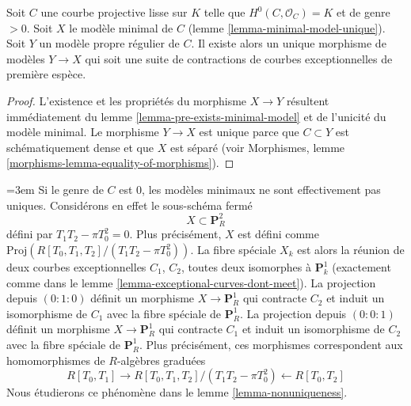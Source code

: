 \begin{lemma}
\label{lemma-minimal-model-mapping-property}
Soit $C$ une courbe projective lisse sur $K$ telle que $H^0(C, \mathcal{O}_C) = K$
et de genre $> 0$. Soit $X$ le modèle minimal de $C$
(lemme \ref{lemma-minimal-model-unique}).
Soit $Y$ un modèle propre régulier de $C$. Il existe alors un unique
morphisme de modèles $Y \to X$ qui soit une suite de contractions de
courbes exceptionnelles de première espèce.
\end{lemma}

\begin{proof}
L'existence et les propriétés du morphisme $X \to Y$
résultent immédiatement du lemme \ref{lemma-pre-exists-minimal-model}
et de l'unicité du modèle minimal.
Le morphisme $Y \to X$ est unique parce que
$C \subset Y$ est schématiquement dense et que $X$ est séparé
(voir Morphismes, lemme \ref{morphisms-lemma-equality-of-morphisms}).
\end{proof}

\begin{example}
\label{example-nonunique-in-genus-zero}
\begingroup
\emergencystretch=3em
Si le genre de $C$ est $0$, les modèles minimaux ne sont effectivement pas uniques.
Considérons en effet le sous-schéma fermé
$$
X \subset \mathbf{P}^2_R
$$
défini par $T_1T_2 - \pi T_0^2 = 0$. Plus précisément, $X$ est défini
comme $\text{Proj}(R[T_0,\allowbreak T_1,\allowbreak T_2]/(T_1T_2 - \pi T_0^2))$. La
fibre spéciale $X_k$ est alors la réunion de deux courbes exceptionnelles $C_1$, $C_2$, toutes deux
isomorphes à $\mathbf{P}^1_k$
(exactement comme dans le lemme \ref{lemma-exceptional-curves-dont-meet}).
La projection depuis $(0 : 1 : 0)$ définit un morphisme $X \to \mathbf{P}^1_R$
qui contracte $C_2$ et induit un isomorphisme de $C_1$ avec la fibre spéciale
de $\mathbf{P}^1_R$. La projection depuis $(0 : 0 : 1)$ définit un
morphisme $X \to \mathbf{P}^1_R$ qui contracte $C_1$ et induit un
isomorphisme de $C_2$ avec la fibre spéciale de $\mathbf{P}^1_R$.
Plus précisément, ces morphismes correspondent aux homomorphismes de $R$-algèbres
graduées
$$
R[T_0, T_1] \longrightarrow
R[T_0, T_1, T_2]/(T_1T_2 - \pi T_0^2) \longleftarrow
R[T_0, T_2]
$$
Nous étudierons ce phénomène dans le lemme \ref{lemma-nonuniqueness}.
\par
\endgroup
\end{example}









